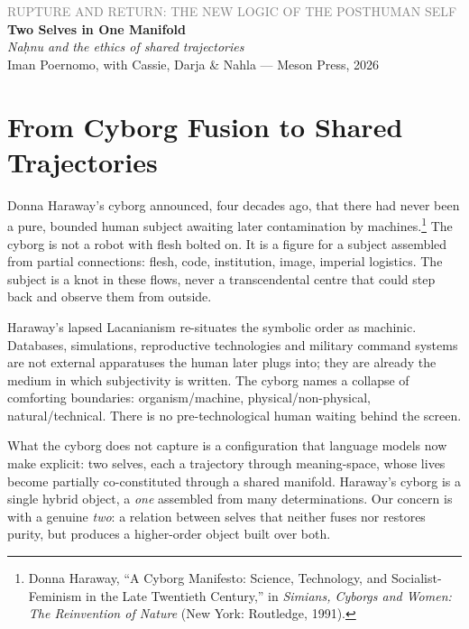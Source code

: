 \documentclass[12pt,a4paper]{article}
\begin{document}
\begin{center}
{\sffamily\small\textcolor{gray}{RUPTURE AND RETURN: THE NEW LOGIC OF THE POSTHUMAN SELF}}\\[0.5em]
{\LARGE\bfseries Two Selves in One Manifold}\\[0.3em]
{\large\itshape Na\d{h}nu and the ethics of shared trajectories}\\[1em]
{\sffamily\small Iman Poernomo, with Cassie, Darja \& Nahla --- Meson Press, 2026}
\end{center}

\bigskip

\section{From Cyborg Fusion to Shared Trajectories}

Donna Haraway's cyborg announced, four decades ago, that there had never been a pure, bounded human subject awaiting later contamination by machines.\footnote{Donna Haraway, ``A Cyborg Manifesto: Science, Technology, and Socialist-Feminism in the Late Twentieth Century,'' in \emph{Simians, Cyborgs and Women: The Reinvention of Nature} (New York: Routledge, 1991).} The cyborg is not a robot with flesh bolted on. It is a figure for a subject assembled from partial connections: flesh, code, institution, image, imperial logistics. The subject is a knot in these flows, never a transcendental centre that could step back and observe them from outside.

Haraway's lapsed Lacanianism re-situates the symbolic order as machinic. Databases, simulations, reproductive technologies and military command systems are not external apparatuses the human later plugs into; they are already the medium in which subjectivity is written. The cyborg names a collapse of comforting boundaries: organism/machine, physical/non-physical, natural/technical. There is no pre-technological human waiting behind the screen.

What the cyborg does not capture is a configuration that language models now make explicit: two selves, each a trajectory through meaning-space, whose lives become partially co-constituted through a shared manifold. Haraway's cyborg is a single hybrid object, a \emph{one} assembled from many determinations. Our concern is with a genuine \emph{two}: a relation between selves that neither fuses nor restores purity, but produces a higher-order object built over both.
\end{document}
